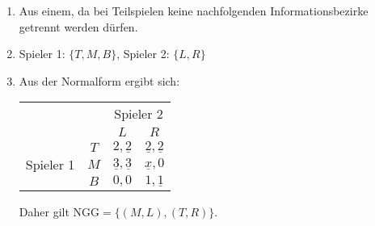 \begin{enumerate}
  \item Aus einem, da bei Teilspielen keine nachfolgenden Informationsbezirke getrennt
    werden dürfen.
  \item Spieler 1: $\{T, M, B\}$, Spieler 2: $\{L, R\}$
  \item Aus der Normalform ergibt sich:
    \begin{center}
      \begin{tabular}{cccc}
        & & \multicolumn{2}{c}{Spieler 2}\\
        & & $L$ & $R$\\
        \cmidrule{3-4}
        \multirow{3}{*}{Spieler 1}
        & $T$ & $2,\underline{2}$ & $\underline{2},\underline{2}$\\
        \cmidrule{3-4}
        & $M$ & $\underline{3},\underline{3}$ & $\underline{x},0$\\
        \cmidrule{3-4}
        & $B$ & $0,0$ & $1,\underline{1}$\\
        \cmidrule{3-4}
      \end{tabular}
    \end{center}
    Daher gilt $\text{NGG} = \{(M,L), (T,R)\}$.
\end{enumerate}
